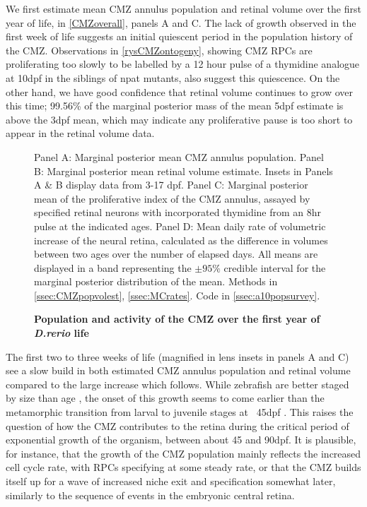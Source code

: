 We first estimate mean CMZ annulus population and retinal volume over the first year of life, in \autoref{CMZoverall}, panels A and C. The lack of growth observed in the first week of life suggests an initial quiescent period in the population history of the CMZ. Observations in \autoref{rysCMZontogeny}, showing CMZ RPCs are proliferating too slowly to be labelled by a 12 hour pulse of a thymidine analogue at 10dpf in the siblings of npat mutants, also suggest this quiescence. On the other hand, we have good confidence that retinal volume continues to grow over this time; 99.56\% of the marginal posterior mass of the mean 5dpf estimate is above the 3dpf mean, which may indicate any proliferative pause is too short to appear in the retinal volume data.

\begin{figure}[!h]
    \caption{{\bf Population and activity of the CMZ over the first year of \textit{D.rerio} life}}
    Panel A: Marginal posterior mean CMZ annulus population. Panel B: Marginal posterior mean retinal volume estimate. Insets in Panels A \& B display data from 3-17 dpf. Panel C: Marginal posterior mean of the proliferative index of the CMZ annulus, assayed by specified retinal neurons with incorporated thymidine from an 8hr pulse at the indicated ages. Panel D: Mean daily rate of volumetric increase of the neural retina, calculated as the difference in volumes between two ages over the number of elapsed days. All means are displayed in a band representing the $\pm 95 \%$ credible interval for the marginal posterior distribution of the mean.
    \label{CMZoverall}
    Methods in \autoref{ssec:CMZpopvolest}, \autoref{ssec:MCrates}.
    Code in \autoref{ssec:a10popsurvey}.
\end{figure}

The first two to three weeks of life (magnified in lens insets in panels A and C) see a slow build in both estimated CMZ annulus population and retinal volume compared to the large increase which follows. While zebrafish are better staged by size than age \cite{Parichy2009}, the onset of this growth seems to come earlier than the metamorphic transition from larval to juvenile stages at ~45dpf \cite{Singleman2014}. This raises the question of how the CMZ contributes to the retina during the critical period of exponential growth of the organism, between about 45 and 90dpf. It is plausible, for instance, that the growth of the CMZ population mainly reflects the increased cell cycle rate, with RPCs specifying at some steady rate, or that the CMZ builds itself up for a wave of increased niche exit and specification somewhat later, similarly to the sequence of events in the embryonic central retina.

